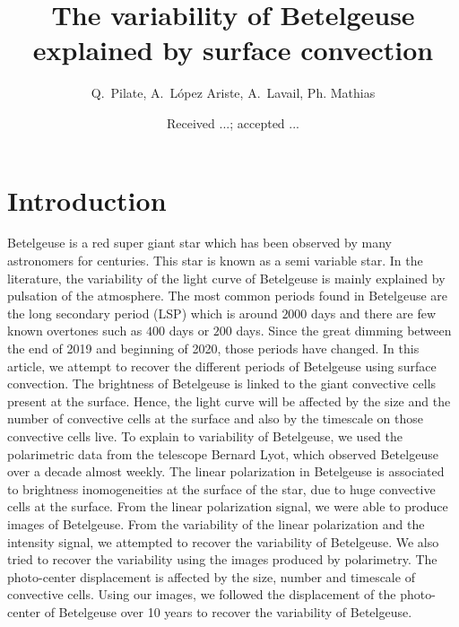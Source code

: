 \documentclass{aa}
\begin{document}
 


   \title{The variability of Betelgeuse explained by surface convection}


    \author{{ Q.~Pilate},{ A.~L{\'o}pez Ariste},{ A.~Lavail},{ Ph. Mathias} }


   \date{Received ...; accepted ...}

 
  \abstract


   \keywords{
               }

   \maketitle
%

\section{Introduction}
Betelgeuse is a red super giant star which has been observed by many astronomers for centuries. This star is known as a 
semi variable star. In the literature, the variability of the light curve of Betelgeuse is mainly explained by pulsation of 
the atmosphere. The most common periods found in Betelgeuse are the long secondary period (LSP) which is around $2000$ days 
and there are few known overtones such as $400$ days or $200$ days. Since the great dimming between the end of 2019 and 
beginning of 2020, those periods have changed. In this article, we attempt to recover the different periods of Betelgeuse 
using surface convection. The brightness of Betelgeuse is linked to the giant convective cells present at the surface. Hence, 
the light curve will be affected by the size and the number of convective cells at the surface and also by the timescale on 
those convective cells live. To explain to variability of Betelgeuse, we used the polarimetric data from the telescope Bernard 
Lyot, which observed Betelgeuse over a decade almost weekly. The linear polarization in Betelgeuse is associated to brightness 
inomogeneities at the surface of the star, due to huge convective cells at the surface. From the linear polarization signal, 
we were able to produce images of Betelgeuse. From the variability of the linear polarization and the intensity signal, we 
attempted to recover the variability of Betelgeuse. We also tried to recover the variability using the images produced by 
polarimetry. The photo-center displacement is affected by the size, number and timescale of convective cells. Using our 
images, we followed the displacement of the photo-center of Betelgeuse over 10 years to recover the variability of 
Betelgeuse. 
\end{document}
